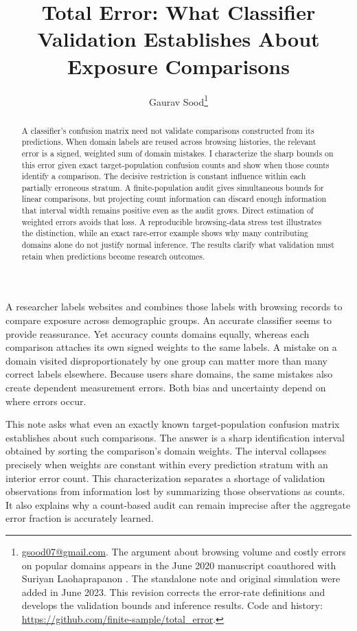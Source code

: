 \documentclass[11pt,letterpaper]{article}
\title{Total Error: What Classifier Validation Establishes About Exposure Comparisons}
\author{Gaurav Sood\thanks{\href{mailto:gsood07@gmail.com}{gsood07@gmail.com}.
The argument about browsing volume and costly errors on popular domains appears
in the June 2020 manuscript coauthored with Suriyan Laohaprapanon
\citep{laohaprapanon2020domain}. The standalone note and original simulation
were added in June 2023. This revision corrects the error-rate definitions
and develops the validation bounds and inference results. Code and history:
\url{https://github.com/finite-sample/total_error}.}}
\date{}
\begin{document}
\maketitle

\begin{abstract}
A classifier's confusion matrix need not validate comparisons constructed from
its predictions. When domain labels are reused across browsing histories, the
relevant error is a signed, weighted sum of domain mistakes. I characterize the
sharp bounds on this error given exact target-population confusion counts and
show when those counts identify a comparison. The decisive restriction is
constant influence within each partially erroneous stratum. A finite-population
audit gives simultaneous bounds for linear comparisons, but projecting count
information can discard enough information that interval width remains positive
even as the audit grows. Direct estimation of weighted errors avoids that loss.
A reproducible browsing-data stress test illustrates the distinction, while
an exact rare-error example shows why many contributing domains alone do not
justify normal inference. The results clarify what validation must retain when
predictions become research outcomes.
\end{abstract}

A researcher labels websites and combines those labels with browsing records
to compare exposure across demographic groups. An accurate classifier seems
to provide reassurance. Yet accuracy counts domains equally, whereas each
comparison attaches its own signed weights to the same labels. A mistake on
a domain visited disproportionately by one group can matter more than many
correct labels elsewhere. Because users share domains, the same mistakes also
create dependent measurement errors. Both bias and uncertainty depend on where
errors occur.

This note asks what even an exactly known target-population confusion matrix
establishes about such comparisons. The answer is a sharp identification
interval obtained by sorting the comparison's domain weights. The interval
collapses precisely when weights are constant within every prediction stratum
with an interior error count. This characterization separates a shortage of
validation observations from information lost by summarizing those observations
as counts. It also explains why a count-based audit can remain imprecise after
the aggregate error fraction is accurately learned.
\end{document}
